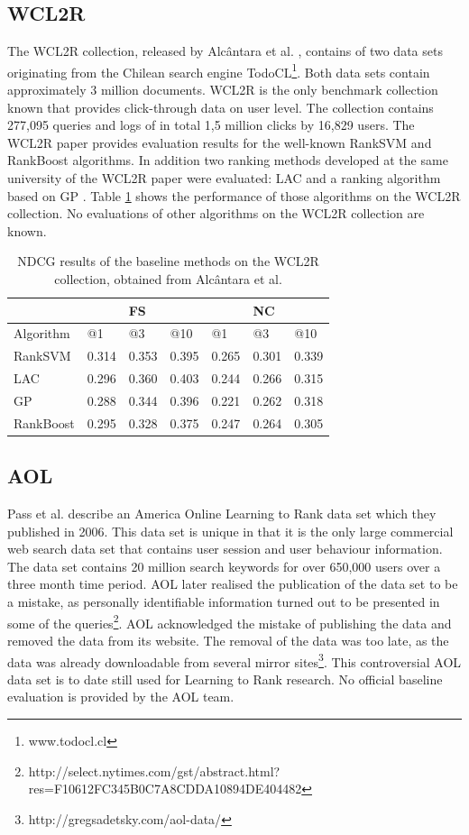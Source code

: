 \subsection{WCL2R}
The WCL2R collection, released by Alc{\^a}ntara et al. \cite{Alcantara2010}, contains of two data sets originating from the Chilean search engine TodoCL\footnote{www.todocl.cl}. Both data sets contain approximately 3 million documents. WCL2R is the only benchmark collection known that provides click-through data on user level. The collection contains 277,095 queries and logs of in total 1,5 million clicks by 16,829 users. The WCL2R paper provides evaluation results for the well-known Rank\ac{SVM} \cite{Herbrich1999,Joachims2002} and RankBoost \cite{Freund2003} algorithms. In addition two ranking methods developed at the same university of the WCL2R paper were evaluated: LAC \cite{Veloso2008} and a ranking algorithm based on \ac{GP} \cite{DeAlmeida2007}. Table \ref{tab:results_WCL2R} shows the performance of those algorithms on the WCL2R collection. No evaluations of other algorithms on the WCL2R collection are known.

\begin{table}[!h]
\begin{tabular}{l|lll|lll}
 &  & FS &  &  & NC &  \\ 
\hline
Algorithm & @1 & @3 & @10 & @1 & @3 & @10 \\ 
\hline
RankSVM & 0.314 & 0.353 & 0.395 & 0.265 & 0.301 & 0.339 \\ 
LAC & 0.296 & 0.360 & 0.403 & 0.244 & 0.266 & 0.315 \\ 
GP & 0.288 & 0.344 & 0.396 & 0.221 & 0.262 & 0.318 \\ 
RankBoost & 0.295 & 0.328 & 0.375 & 0.247 & 0.264 & 0.305 \\ 
\end{tabular}
\caption{\acs{NDCG} results of the baseline methods on the WCL2R collection, obtained from Alc\^{a}ntara et al. \cite{Alcantara2010}}
\label{tab:results_WCL2R}
\end{table}

\subsection{AOL}
Pass et al. \cite{Pass2006} describe an America Online Learning to Rank data set which they published in 2006. This data set is unique in that it is the only large commercial web search data set that contains user session and user behaviour information. The data set contains 20 million search keywords for over 650,000 users over a three month time period. AOL later realised the publication of the data set to be a mistake, as personally identifiable information turned out to be presented in some of the queries\footnote{http://select.nytimes.com/gst/abstract.html?res=F10612FC345B0C7A8CDDA10894DE404482}. AOL acknowledged the mistake of publishing the data and removed the data from its website. The removal of the data was too late, as the data was already downloadable from several mirror sites\footnote{http://gregsadetsky.com/aol-data/}. This controversial AOL data set is to date still used for Learning to Rank research. No official baseline evaluation is provided by the AOL team.

